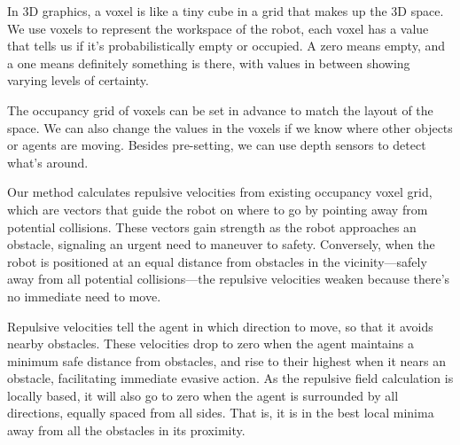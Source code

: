 \documentclass[letterpaper, 10 pt, conference]{ieeeconf}  %
\begin{document}
In 3D graphics, a voxel is like a tiny cube in a grid that makes up the 3D space. We use voxels to represent the workspace of the robot, each voxel has a value that tells us if it’s probabilistically empty or occupied. A zero means empty, and a one means definitely something is there, with values in between showing varying levels of certainty.


The occupancy grid of voxels can be set in advance to match the layout of the space. We can also change the values in the voxels if we know where other objects or agents are moving. Besides pre-setting, we can use depth sensors to detect what's around.

Our method calculates repulsive velocities from existing occupancy voxel grid, which are vectors that guide the robot on where to go by pointing away from potential collisions. These vectors gain strength as the robot approaches an obstacle, signaling an urgent need to maneuver to safety. Conversely, when the robot is positioned at an equal distance from obstacles in the vicinity—safely away from all potential collisions—the repulsive velocities weaken because there’s no immediate need to move. 



Repulsive velocities tell the agent in which direction to move, so that it avoids nearby obstacles. These velocities drop to zero when the agent maintains a minimum safe distance from obstacles, and rise to their highest when it nears an obstacle, facilitating immediate evasive action. As the repulsive field calculation is locally based, it will also go to zero when the agent is surrounded by all directions, equally spaced from all sides. That is, it is in the best local minima away from all the obstacles in its proximity. 
\end{document}
